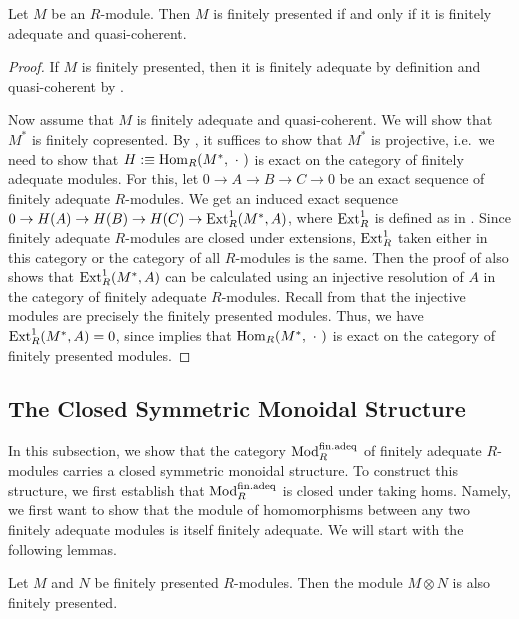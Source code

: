 \begin{proposition}
  Let $M$ be an $R$-module.
  Then $M$ is finitely presented if and only if it is finitely adequate and quasi-coherent.
\end{proposition}

\begin{proof}
  If $M$ is finitely presented, then it is finitely adequate by definition and quasi-coherent by .

  Now assume that $M$ is finitely adequate and quasi-coherent.  We will show that $M^\ast$ is finitely copresented.
  By , it suffices to show that $M^\ast$ is projective, i.e.\ we need to show that $H :\equiv \mathrm{Hom}_R(M^\ast,\ \cdot\ )$ is exact on the category of finitely adequate modules.
  For this, let $0 \to A \to B \to C \to 0$ be an exact sequence of finitely adequate $R$-modules.
  We get an induced exact sequence $0 \to H(A) \to H(B) \to H(C) \to \mathrm{Ext}_R^1(M^\ast,A)$, where $\mathrm{Ext}_R^1$ is defined as in \cite[Definition 2.1.5]{ext-groups-in-hott}.
  Since finitely adequate $R$-modules are closed under extensions, $\mathrm{Ext}_R^1$ taken either in this category or the category of all $R$-modules is the same.
  Then the proof of \cite[Proposition 2.5.4]{ext-groups-in-hott} also shows that $\mathrm{Ext}_R^1(M^\ast,A)$ can be calculated using an injective resolution of $A$ in the category of finitely adequate $R$-modules.
  Recall from  that the injective modules are precisely the finitely presented modules.
  Thus, we have $\mathrm{Ext}_R^1(M^\ast,A)=0$, since  implies that $\mathrm{Hom}_R(M^{\ast},\ \cdot\ )$ is exact on the category of finitely presented modules.
\end{proof}

\subsection{The Closed Symmetric Monoidal Structure}\label{ss:closed-monoidal}

In this subsection, we show that the category $\textup{Mod}_{R}^{\mathrm{fin.adeq}}$ of finitely adequate $R$-modules carries a closed symmetric monoidal structure.
To construct this structure, we first establish that $\textup{Mod}_{R}^{\mathrm{fin.adeq}}$ is closed under taking homs.
Namely, we first want to show that the module of homomorphisms between any two finitely adequate modules is itself finitely adequate.
We will start with the following lemmas.

\begin{lemma}\label{lem:fp-tensor-fp}
  Let $M$ and $N$ be finitely presented $R$-modules.
  Then the module $M \otimes N$ is also finitely presented.
\end{lemma}

